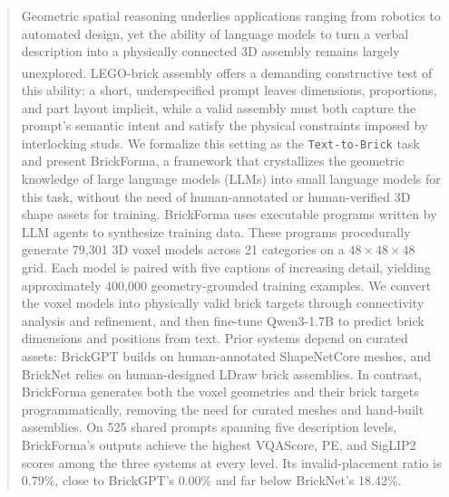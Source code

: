 \begin{abstract}
Geometric spatial reasoning underlies applications ranging from robotics to automated design, yet the ability of language models to turn a verbal description into a physically connected 3D assembly remains largely unexplored. LEGO\textsuperscript{\tiny\textregistered}-brick assembly offers a demanding constructive test of this ability: a short, underspecified prompt leaves dimensions, proportions, and part layout implicit, while a valid assembly must both capture the prompt's semantic intent and satisfy the physical constraints imposed by interlocking studs. We formalize this setting as the \texttt{Text-to-Brick} task and present BrickForma, a framework that crystallizes the
geometric knowledge of large language models (LLMs) into small language models for this task, without the need of human-annotated
or human-verified 3D shape assets for training. BrickForma uses executable programs written by LLM agents to synthesize training data. These programs procedurally generate 79,301 3D voxel models across 21 categories on a $48\times48\times48$ grid. Each model is paired with five captions of increasing detail, yielding approximately 400,000 geometry-grounded training examples. We convert the voxel models into physically valid brick targets through connectivity analysis and refinement, and then fine-tune Qwen3-1.7B to predict brick dimensions and positions from text. Prior systems depend on curated assets: BrickGPT builds on human-annotated ShapeNetCore meshes, and BrickNet relies on human-designed LDraw brick assemblies. In contrast, BrickForma generates both the voxel geometries and their brick targets programmatically, removing the need for curated meshes and hand-built assemblies.
On 525 shared prompts spanning five description levels, BrickForma's outputs %
achieve the highest VQAScore, PE, and SigLIP2 scores among the three systems at every level. Its invalid-placement ratio is 0.79\%, close to BrickGPT's 0.00\% and far below BrickNet's 18.42\%.
\end{abstract}